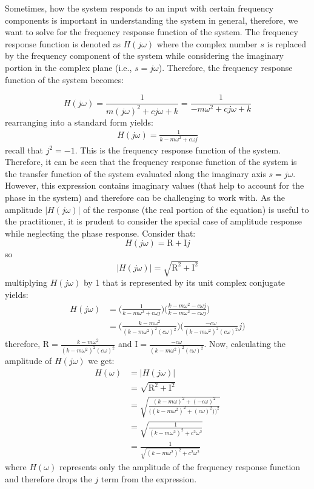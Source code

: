 \documentclass[12pt,letter]{article}
\begin{document}
Sometimes, how the system responds to an input with certain frequency components is important in understanding the system in general, therefore, we want to solve for the frequency response function of the system. The frequency response function is denoted as $H(j\omega)$ where the complex number $s$ is replaced by the frequency component of the system while considering the imaginary portion in the complex plane (i.e., $s = j\omega$). Therefore, the frequency response function of the system becomes:

\begin{equation}
H(j\omega) = \frac{1}{m(j\omega)^2+cj\omega+k} = \frac{1}{-m\omega^2+cj\omega+k} 
\end{equation}
rearranging into a standard form yields:
\begin{eqnarray}
H(j\omega) = \frac{1}{k-m\omega^2+c\omega j}
\label{eq:frequency_response_function}
\end{eqnarray}
recall that $j^2=-1$. This is the frequency response function of the system. Therefore, it can be seen that the frequency response function of the system is the transfer function of the system evaluated along the imaginary axis $s=j\omega$. However, this expression contains imaginary values (that help to account for the phase in the system) and therefore can be challenging to work with. As the amplitude $|H(j\omega)|$ of the response (the real portion of the equation) is useful to the practitioner, it is prudent to consider the special case of amplitude response while neglecting the phase response. Consider that:
\begin{equation}
	H(j\omega) = \text{R}+\text{I}j
\end{equation}  
so
\begin{equation}
	 |H(j\omega)|=\sqrt{\text{R}^2+\text{I}^2}
\end{equation}  
multiplying $H(j\omega)$ by 1 that is represented by its unit complex conjugate yields:
\begin{align}
H(j\omega) &= \bigg( \frac{1}{k-m\omega^2+c\omega j} \bigg) \bigg( \frac{k-m\omega^2-c\omega j}{k-m\omega^2-c\omega j}\bigg) \\
&= \bigg( \frac{k-m\omega^2}{(k-m\omega^2)^2(c\omega)^2} \bigg) \bigg( \frac{-c\omega}{(k-m\omega^2)^2(c\omega)^2}j\bigg) 
\end{align}
therefore, $\text{R} = \frac{k-m\omega^2}{(k-m\omega^2)^2(c\omega)^2} $ and $\text{I} = \frac{-c\omega}{(k-m\omega^2)^2(c\omega)^2}$. Now, calculating the amplitude of $H(j\omega)$ we get:
\begin{align}
H(\omega) &= |H(j\omega)| \\
&=  \sqrt{\text{R}^2+\text{I}^2} \\
&=  \sqrt{\frac{(k-m\omega)^2+(-c\omega)^2}{\big((k-m\omega^2)^2+(c\omega)^2)\big)^2}} \\
&=  \sqrt{\frac{1}{(k-m\omega^2)^2+c^2\omega^2}} \\
&= \frac{1}{\sqrt{(k-m\omega^2)^2+c^2\omega^2}}
\end{align}
where $H(\omega)$ represents only the amplitude of the frequency response function and therefore drops the $j$ term from the expression. 
\end{document}
